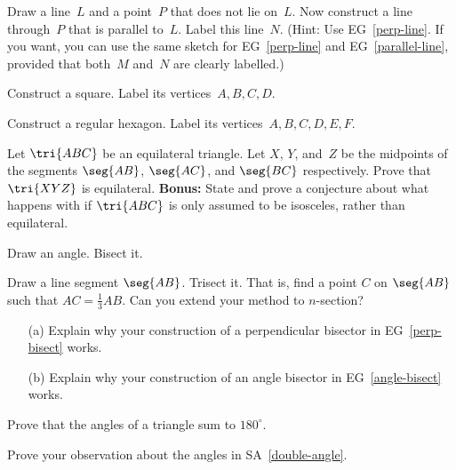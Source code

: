 \begin{EG}\label{parallel-line}
Draw a line~$L$ and a point~$P$ that does not lie on~$L$.
Now construct a line through~$P$ that is parallel to~$L$.
Label this line~$N$.  (Hint: Use EG~\ref{perp-line}.  If you want, you can use the same 
sketch for EG~\ref{perp-line} and EG~\ref{parallel-line}, provided that both~$M$ and~$N$ are clearly
labelled.)
\end{EG}

\begin{EG}\label{square}
Construct a square.  Label its vertices~$A,B,C,D$.
\end{EG}

\begin{EG}\label{hex}
Construct a regular hexagon.  Label its vertices~$A,B,C,D,E,F$.
\end{EG}

\begin{EG}
Let $\tri{ABC}$ be an equilateral triangle.  Let $X$, $Y$, and~$Z$ be the midpoints of the segments $\seg{AB}$, $\seg{AC}$, and $\seg{BC}$ respectively.
Prove that $\tri{XYZ}$ is equilateral.  \textbf{Bonus:} State
and prove a conjecture about what happens with if $\tri{ABC}$ is
only assumed to be isosceles, rather than equilateral.
\end{EG}

\begin{EG}\label{angle-bisect}
Draw an angle.  Bisect it.
\end{EG}

\begin{EG}
Draw a line segment $\seg{AB}$.  Trisect it.  That is, find a point $C$
on $\seg{AB}$ such that $AC=\frac13AB$.  Can you extend your method to
$n$-section?
\end{EG}

\begin{EG}
\begin{enumerate}
\item[(a)] Explain why your construction of a perpendicular bisector in EG~\ref{perp-bisect} works.
\item[(b)] Explain why your construction of an angle bisector in EG~\ref{angle-bisect} works.
\end{enumerate}
\end{EG}

\begin{EG}
Prove that the angles of a triangle sum to $180^\circ$.
\end{EG}

\begin{EG}
Prove your observation about the angles in SA~\ref{double-angle}.
\end{EG}

